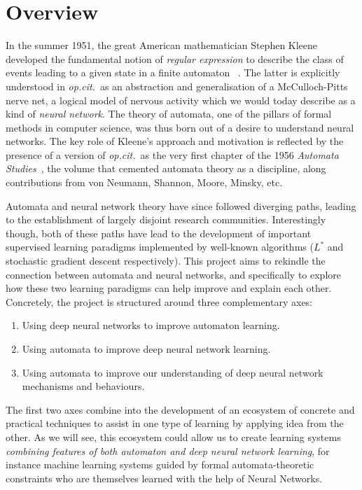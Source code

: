 \documentclass[11pt,a4paper]{article}
\begin{document}
	
	
	\section*{Overview}
	
		In the summer 1951, the great American mathematician Stephen Kleene developed the fundamental notion of \emph{regular expression} to describe the class of events leading to a given state in a finite automaton ~\cite[Theorem 6]{kleene1951}. The latter is explicitly understood in \textit{op.cit.}\ as an abstraction and generalisation of a McCulloch-Pitts nerve net, a logical model of nervous activity which we would today describe as a kind of \emph{neural network}. The theory of automata, one of the pillars of formal methods in computer science, was thus born out of a desire to understand neural networks. The key role of Kleene's approach and motivation is reflected by the presence of a version of \textit{op.cit.}\ as the very first chapter of the 1956 \textit{Automata Studies}~\cite{ashby1956automata}, the volume that cemented automata theory as a discipline, along contributions from von Neumann, Shannon, Moore, Minsky, etc. 
		
		Automata and neural network theory have since followed diverging paths, leading to the establishment of largely disjoint research communities. Interestingly though, both of these paths have lead to the development of important supervised learning paradigms implemented by well-known algorithms ($L^\ast$ and stochastic gradient descent respectively). 		
		This project aims to rekindle the connection between automata and neural networks, and specifically to explore how these two learning paradigms can help improve and explain each other.
		Concretely, the project is structured around  three complementary axes:
		\begin{enumerate}
			\item Using deep neural networks to improve automaton learning.
			\item Using automata to improve deep neural network learning.
			\item Using automata to improve our understanding of deep neural network mechanisms and behaviours.
		\end{enumerate}
		The first two axes combine into the development of an ecosystem of concrete and practical techniques to assist in one type of learning by applying idea from the other. 
		As we will see, this ecosystem could allow us to create learning systems \emph{combining features of both automaton and deep neural network learning}, for instance machine learning systems guided by formal automata-theoretic constraints who are themselves learned with the help of Neural Networks. 
	
\end{document}
